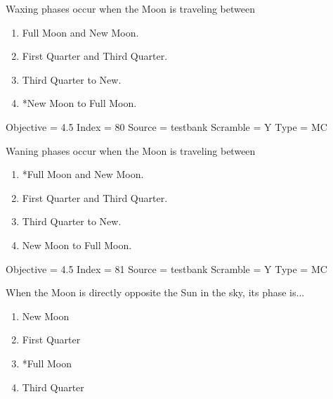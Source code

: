 \documentclass[11pt]{article}
\begin{document}
\begin{enumerate}
\begin{minipage}{\textwidth}
\begin{minipage}{\textwidth}
\item Waxing phases occur when the Moon is traveling between
\begin{multicols}{2}
\begin{enumerate} 
\setlength{\itemsep}{1pt} 
\setlength{\parskip}{0pt} 
\setlength{\parsep}{0pt}
\setlength{\multicolsep}{1pt} 
\item Full Moon and New Moon.
\item First Quarter and Third Quarter.
\item Third Quarter to New.
\item *New Moon to Full Moon.
\end{enumerate} 
\vfill 
\end{multicols}

Objective = 4.5
Index = 80
Source = testbank
Scramble = Y
Type = MC
\end{minipage}
\end{minipage}
\vskip 0.20in

\begin{minipage}{\textwidth}
\begin{minipage}{\textwidth}
\item Waning phases occur when the Moon is traveling between
\begin{multicols}{2}
\begin{enumerate} 
\setlength{\itemsep}{1pt} 
\setlength{\parskip}{0pt} 
\setlength{\parsep}{0pt}
\setlength{\multicolsep}{1pt} 
\item *Full Moon and New Moon.
\item First Quarter and Third Quarter.
\item Third Quarter to New.
\item New Moon to Full Moon.
\end{enumerate} 
\vfill 
\end{multicols}

Objective = 4.5
Index = 81
Source = testbank
Scramble = Y
Type = MC
\end{minipage}
\end{minipage}
\vskip 0.20in

\begin{minipage}{\textwidth}
\begin{minipage}{\textwidth}
\item When the Moon is directly opposite the Sun in the sky, its phase is...
\begin{multicols}{3}
\begin{enumerate} 
\setlength{\itemsep}{1pt} 
\setlength{\parskip}{0pt} 
\setlength{\parsep}{0pt}
\setlength{\multicolsep}{1pt} 
\item New Moon
\item First Quarter
\item *Full Moon
\item Third Quarter
\end{enumerate} 
\vfill 
\end{multicols}


\end{minipage}
\end{minipage}
\end{enumerate}
\end{document}
